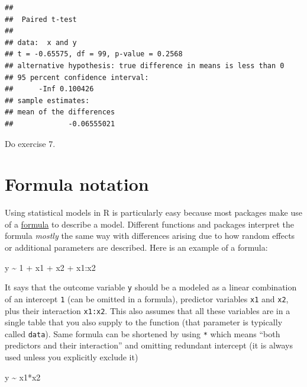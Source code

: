 \documentclass[
]{book}
\newenvironment{Shaded}{\begin{snugshade}}{\end{snugshade}}
\newcommand{\DecValTok}[1]{\textcolor[rgb]{0.00,0.00,0.81}{#1}}
\newcommand{\NormalTok}[1]{#1}
\newcommand{\SpecialCharTok}[1]{\textcolor[rgb]{0.00,0.00,0.00}{#1}}
\begin{document}
\begin{verbatim}
## 
##  Paired t-test
## 
## data:  x and y
## t = -0.65575, df = 99, p-value = 0.2568
## alternative hypothesis: true difference in means is less than 0
## 95 percent confidence interval:
##      -Inf 0.100426
## sample estimates:
## mean of the differences 
##             -0.06555021
\end{verbatim}

Do exercise 7.

\hypertarget{formula-notation}{%
\section{Formula notation}\label{formula-notation}}

Using statistical models in R is particularly easy because most packages make use of a \href{https://stat.ethz.ch/R-manual/R-devel/library/stats/html/formula.html}{formula} to describe a model. Different functions and packages interpret the formula \emph{mostly} the same way with differences arising due to how random effects or additional parameters are described. Here is an example of a formula:

\begin{Shaded}
\begin{Highlighting}[]
\NormalTok{y }\SpecialCharTok{\textasciitilde{}} \DecValTok{1} \SpecialCharTok{+}\NormalTok{ x1 }\SpecialCharTok{+}\NormalTok{ x2 }\SpecialCharTok{+}\NormalTok{ x1}\SpecialCharTok{:}\NormalTok{x2}
\end{Highlighting}
\end{Shaded}

It says that the outcome variable \texttt{y} should be a modeled as a linear combination of an intercept \texttt{1} (can be omitted in a formula), predictor variables \texttt{x1} and \texttt{x2}, plus their interaction \texttt{x1:x2}. This also assumes that all these variables are in a single table that you also supply to the function (that parameter is typically called \texttt{data}). Same formula can be shortened by using \texttt{*} which means ``both predictors and their interaction'' and omitting redundant intercept (it is always used unless you explicitly exclude it)

\begin{Shaded}
\begin{Highlighting}[]
\NormalTok{y }\SpecialCharTok{\textasciitilde{}}\NormalTok{ x1}\SpecialCharTok{*}\NormalTok{x2}
\end{Highlighting}
\end{Shaded}
\end{document}
